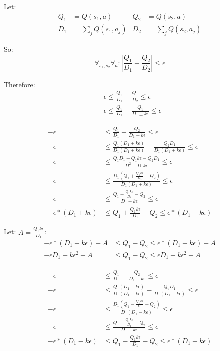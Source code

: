 \documentclass[11pt]{amsart}
\begin{document}
Let:
\begin{align}
Q_1 &= Q(s_1,a) &Q_2 &= Q(s_2,a) \\
D_1 &= \sum_j Q(s_1,a_j) &D_2 &= \sum_j Q(s_2,a_j) 
\end{align}

So:
\begin{equation}
\forall_{s_1,s_2} \forall_a : | \frac{Q_1}{D_1} - \frac{Q_2}{D_2} | \leq \epsilon
\end{equation}

Therefore:
\begin{align*}
-\epsilon \leq \frac{Q_1}{D_1} - \frac{Q_1}{D_2} \leq \epsilon \\
-\epsilon \leq \frac{Q_1}{D_1} - \frac{Q_1}{D_1 \pm k\epsilon} \leq \epsilon
\end{align*}

\encircle{+}
\begin{align*}
-\epsilon &\leq \frac{Q_1}{D_1} - \frac{Q_2}{D_1 + k\epsilon} \leq \epsilon \\
-\epsilon &\leq \frac{Q_1 (D_1 + k\epsilon)}{D_1(D_1 + k\epsilon)} - \frac{Q_2 D_1}{D_1 (D_1 + k\epsilon)} \leq \epsilon \\
-\epsilon &\leq \frac{Q_1 D_1 + Q_1 k \epsilon - Q_2 D_1}{D_1^2 + D_1 k \epsilon} \leq \epsilon \\
-\epsilon &\leq \frac{D_1 (Q_1 + \frac{Q_1 k \epsilon}{D_1} - Q_2)}{D_1 (D_1 + k \epsilon)} \leq \epsilon \\
-\epsilon &\leq \frac{Q_1 + \frac{Q_1 k \epsilon}{D_1} - Q_2}{D_1 + k \epsilon} \leq \epsilon \\
-\epsilon*(D_1 + k \epsilon) &\leq Q_1 + \frac{Q_1 k \epsilon}{D_1} - Q_2 \leq \epsilon*(D_1 + k \epsilon)
\end{align*}

Let: $A = \frac{Q_1 k \epsilon}{D_1}$:
\begin{align*}
-\epsilon*(D_1 + k \epsilon) - A &\leq Q_1 - Q_2 \leq \epsilon*(D_1 + k \epsilon) - A \\
-\epsilon D_1 - k \epsilon^2 - A &\leq Q_1 - Q_2 \leq \epsilon D_1 + k \epsilon^2 - A
\end{align*}


\encircle{-}
\begin{align*}
-\epsilon &\leq \frac{Q_1}{D_1} - \frac{Q_2}{D_1 - k\epsilon} \leq \epsilon \\
-\epsilon &\leq \frac{Q_1 (D_1 - k\epsilon)}{D_1(D_1 - k\epsilon)} - \frac{Q_2 D_1}{D_1 (D_1 - k\epsilon)} \leq \epsilon \\
-\epsilon &\leq \frac{D_1 (Q_1 - \frac{Q_1 k \epsilon}{D_1} - Q_2)}{D_1 (D_1 - k \epsilon)} \leq \epsilon \\
-\epsilon &\leq \frac{Q_1 - \frac{Q_1 k \epsilon}{D_1} - Q_2}{D_1 - k \epsilon} \leq \epsilon \\
-\epsilon*(D_1 - k \epsilon) &\leq Q_1 - \frac{Q_1 k \epsilon}{D_1} - Q_2 \leq \epsilon*(D_1 - k \epsilon)
\end{align*}
\end{document}
